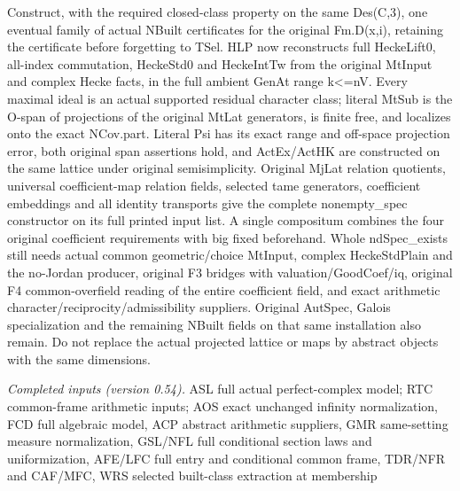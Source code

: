 Construct, with the required closed-class property on the same Des(C,3), one eventual family of actual NBuilt certificates for the original Fm.D(x,i), retaining the certificate before forgetting to TSel. HLP now reconstructs full HeckeLift0, all-index commutation, HeckeStd0 and HeckeIntTw from the original MtInput and complex Hecke facts, in the full ambient GenAt range k<=nV. Every maximal ideal is an actual supported residual character class; literal MtSub is the O-span of projections of the original MtLat generators, is finite free, and localizes onto the exact NCov.part. Literal Psi has its exact range and off-space projection error, both original span assertions hold, and ActEx/ActHK are constructed on the same lattice under original semisimplicity. Original MjLat relation quotients, universal coefficient-map relation fields, selected tame generators, coefficient embeddings and all identity transports give the complete nonempty\_\allowbreak spec constructor on its full printed input list. A single compositum combines the four original coefficient requirements with big fixed beforehand. Whole ndSpec\_\allowbreak exists still needs actual common geometric/choice MtInput, complex HeckeStdPlain and the no-Jordan producer, original F3 bridges with valuation/GoodCoef/iq, original F4 common-overfield reading of the entire coefficient field, and exact arithmetic character/reciprocity/admissibility suppliers. Original AutSpec, Galois specialization and the remaining NBuilt fields on that same installation also remain. Do not replace the actual projected lattice or maps by abstract objects with the same dimensions.

\emph{Completed inputs (version 0.54).} ASL full actual perfect-complex model; RTC common-frame arithmetic inputs; AOS exact unchanged infinity normalization, FCD full algebraic model, ACP abstract arithmetic suppliers, GMR same-setting measure normalization, GSL/NFL full conditional section laws and uniformization, AFE/LFC full entry and conditional common frame, TDR/NFR and CAF/MFC, WRS selected built-class extraction at membership

